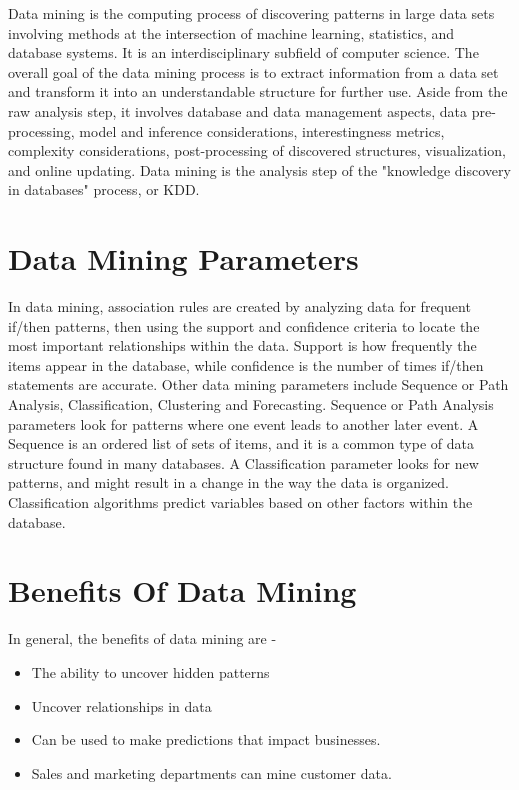 Data mining is the computing process of discovering patterns in large data sets involving methods at the intersection of machine learning, statistics, and database systems. It is an interdisciplinary subfield of computer science. The overall goal of the data mining process is to extract information from a data set and transform it into an understandable structure for further use. Aside from the raw analysis step, it involves database and data management aspects, data pre-processing, model and inference considerations, interestingness metrics, complexity considerations, post-processing of discovered structures, visualization, and online updating. Data mining is the analysis step of the "knowledge discovery in databases" process, or KDD.
\section{Data Mining Parameters}
In data mining, association rules are created by analyzing data for frequent if/then patterns, then using the support and confidence criteria to locate the most important relationships within the data. Support is how frequently the items appear in the database, while confidence is the number of times if/then statements are accurate.
Other data mining parameters include Sequence or Path Analysis, Classification, Clustering and Forecasting. Sequence or Path Analysis parameters look for patterns where one event leads to another later event. A Sequence is an ordered list of sets of items, and it is a common type of data structure found in many databases. A Classification parameter looks for new patterns, and might result in a change in the way the data is organized. Classification algorithms predict variables based on other factors within the database.

\section{Benefits Of Data Mining}
In general, the benefits of data mining are -
\begin{itemize}
\item The ability to uncover hidden patterns
\item Uncover relationships in data
\item Can be used to make predictions that impact businesses.
\item Sales and marketing departments can mine customer data.
\end{itemize}
